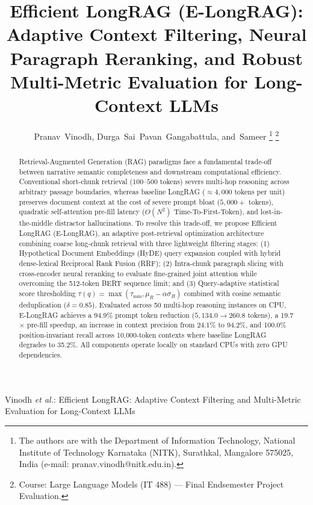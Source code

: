 \documentclass[lettersize,journal]{IEEEtran}
\begin{document}
\title{Efficient LongRAG (E-LongRAG): Adaptive Context Filtering, Neural Paragraph Reranking, and Robust Multi-Metric Evaluation for Long-Context LLMs}

\author{Pranav~Vinodh,
        Durga~Sai~Pavan~Gangabattula,
        and~Sameer%
\thanks{The authors are with the Department of Information Technology, National Institute of Technology Karnataka (NITK), Surathkal, Mangalore 575025, India (e-mail: pranav.vinodh@nitk.edu.in).}%
\thanks{Course: Large Language Models (IT 488) --- Final Endsemester Project Evaluation.}}

%
{Vinodh \MakeLowercase{\textit{et al.}}: Efficient LongRAG: Adaptive Context Filtering and Multi-Metric Evaluation for Long-Context LLMs}


\maketitle

\begin{abstract}
Retrieval-Augmented Generation (RAG) paradigms face a fundamental trade-off between narrative semantic completeness and downstream computational efficiency. Conventional short-chunk retrieval ($100$--$500$ tokens) severs multi-hop reasoning across arbitrary passage boundaries, whereas baseline LongRAG ($\approx 4,000$ tokens per unit) preserves document context at the cost of severe prompt bloat ($5,000+$ tokens), quadratic self-attention pre-fill latency ($O(N^2)$ Time-To-First-Token), and lost-in-the-middle distractor hallucinations. To resolve this trade-off, we propose Efficient LongRAG (E-LongRAG), an adaptive post-retrieval optimization architecture combining coarse long-chunk retrieval with three lightweight filtering stages: (1) Hypothetical Document Embeddings (HyDE) query expansion coupled with hybrid dense-lexical Reciprocal Rank Fusion (RRF); (2) Intra-chunk paragraph slicing with cross-encoder neural reranking to evaluate fine-grained joint attention while overcoming the 512-token BERT sequence limit; and (3) Query-adaptive statistical score thresholding $\tau(q) = \max(\tau_{\min}, \mu_R - \alpha \sigma_R)$ combined with cosine semantic deduplication ($\delta = 0.85$). Evaluated across 50 multi-hop reasoning instances on CPU, E-LongRAG achieves a 94.9\% prompt token reduction ($5,134.0 \rightarrow 260.8$ tokens), a 19.7$\times$ pre-fill speedup, an increase in context precision from 24.1\% to 94.2\%, and 100.0\% position-invariant recall across 10,000-token contexts where baseline LongRAG degrades to 35.2\%. All components operate locally on standard CPUs with zero GPU dependencies.
\end{abstract}
\end{document}
